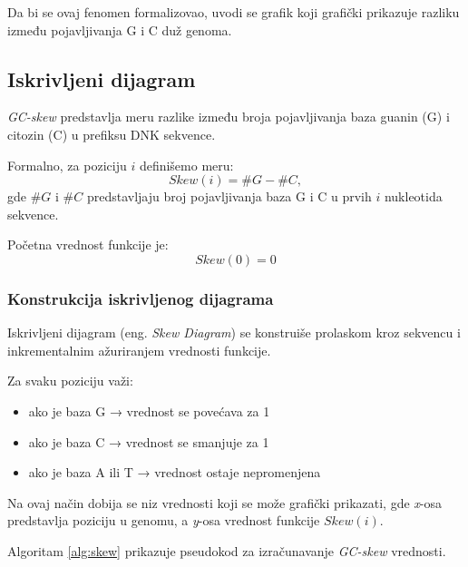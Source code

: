 \documentclass[12pt,oneside]{memoir}
\begin{document}
Da bi se ovaj fenomen formalizovao, uvodi se grafik koji grafički prikazuje razliku između pojavljivanja G i C duž genoma.


\subsection{Iskrivljeni dijagram}

\textit{GC-skew} predstavlja meru razlike između broja pojavljivanja baza guanin (G) i citozin (C) u prefiksu DNK sekvence.

Formalno, za poziciju $i$ definišemo meru:
\[
Skew(i) = \#G - \#C,
\]
gde $\#G$ i $\#C$ predstavljaju broj pojavljivanja baza G i C u prvih $i$ nukleotida sekvence.

Početna vrednost funkcije je:
\[
Skew(0) = 0
\]

\subsubsection{Konstrukcija iskrivljenog dijagrama}

Iskrivljeni dijagram (eng. \textit{Skew Diagram}) se konstruiše prolaskom kroz sekvencu i inkrementalnim ažuriranjem vrednosti funkcije.

Za svaku poziciju važi:
\begin{itemize}
\item ako je baza G → vrednost se povećava za 1
\item ako je baza C → vrednost se smanjuje za 1
\item ako je baza A ili T → vrednost ostaje nepromenjena
\end{itemize}

Na ovaj način dobija se niz vrednosti koji se može grafički prikazati, gde \textit{x}-osa predstavlja poziciju u genomu, a \textit{y}-osa vrednost funkcije $Skew(i)$.

Algoritam \ref{alg:skew} prikazuje pseudokod za izračunavanje \textit{GC-skew} vrednosti.

\begin{algorithm}[h]
\caption{Izračunavanje GC-skew}
\label{alg:skew}
\SetAlgoLined
\DontPrintSemicolon
{}
\end{algorithm}
\end{document}
